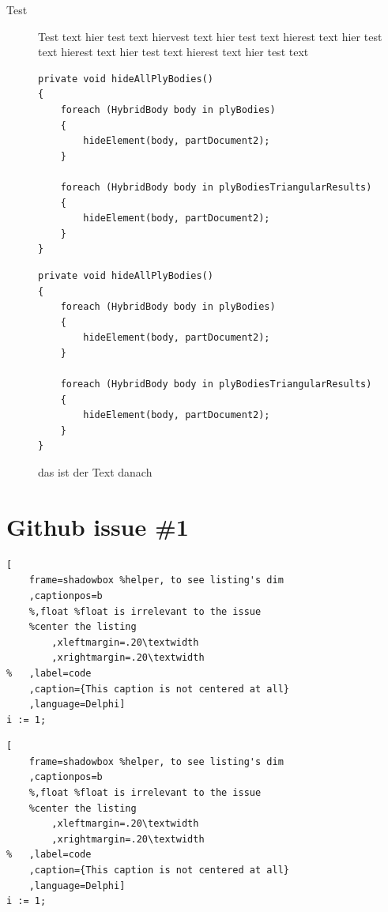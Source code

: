 \documentclass[a4paper,11pt]{article}
\makeatletter
\let\@makecaption@ORI\@makecaption
\let\lst@MakeCaption@ORI\lst@MakeCaption
\let\@makecaption@CAPTION\@makecaption
\let\lst@MakeCaption@CAPTION\lst@MakeCaption}
\newcommand\Original{\let\@makecaption\@makecaption@ORI\let\lst@MakeCaption\lst@MakeCaption@ORI}
\newcommand\Caption{\let\@makecaption\@makecaption@CAPTION\let\lst@MakeCaption\lst@MakeCaption@CAPTION}
\makeatother
\begin{document}
\captionsetup{box=colorbox,boxcolor=orange!20}

\begin{description}
        \item[Test] Test text hier test text hiervest text hier test text hierest text hier test text hierest text hier test text hierest text hier test text
        
\begin{lstlisting}[caption=Titel des Codes, captionpos=t]
private void hideAllPlyBodies()
{
    foreach (HybridBody body in plyBodies)
    {
        hideElement(body, partDocument2);
    }

    foreach (HybridBody body in plyBodiesTriangularResults)
    {
        hideElement(body, partDocument2);
    }
}
\end{lstlisting}
\begin{lstlisting}[caption=Titel des Codes, captionpos=b]
private void hideAllPlyBodies()
{
    foreach (HybridBody body in plyBodies)
    {
        hideElement(body, partDocument2);
    }

    foreach (HybridBody body in plyBodiesTriangularResults)
    {
        hideElement(body, partDocument2);
    }
}
\end{lstlisting}

das ist der Text danach

\end{description}

\clearpage
\section*{Github issue \#1}

\lstset{%
        numbers=none,
        framexleftmargin=0pt}

\Original

\begin{lstlisting}[
	frame=shadowbox %helper, to see listing's dim
	,captionpos=b
	%,float %float is irrelevant to the issue
	%center the listing
		,xleftmargin=.20\textwidth
		,xrightmargin=.20\textwidth
%	,label=code
	,caption={This caption is not centered at all}
	,language=Delphi]
i := 1;
\end{lstlisting}

\Caption\captionsetup{box=none}

\begin{lstlisting}[
	frame=shadowbox %helper, to see listing's dim
	,captionpos=b
	%,float %float is irrelevant to the issue
	%center the listing
		,xleftmargin=.20\textwidth
		,xrightmargin=.20\textwidth
%	,label=code
	,caption={This caption is not centered at all}
	,language=Delphi]
i := 1;
\end{lstlisting}
\end{document}

